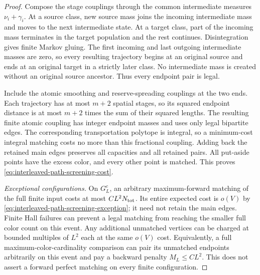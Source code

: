 \documentclass[11pt,reqno]{amsart}
\theoremstyle{definition}
\theoremstyle{remark}
\numberwithin{equation}{section}
\begin{document}
\begin{proof}
Compose the stage couplings through the common intermediate measures
$\nu_i+\gamma_i$. At a source class, new source mass joins the incoming
intermediate mass and moves to the next intermediate state. At a target
class, part of the incoming mass terminates in the target population
and the rest continues. Disintegration gives finite Markov gluing.
The first incoming and last outgoing intermediate masses are zero, so
every resulting trajectory begins at an original source and ends at an
original target in a strictly later class. No intermediate mass is
created without an original source ancestor. Thus every endpoint pair
is legal.

Include the atomic smoothing and reserve-spreading couplings at the
two ends. Each trajectory has at most $m+2$ spatial stages, so its
squared endpoint distance is at most $m+2$ times the sum of their squared
lengths. The resulting finite atomic coupling has integer endpoint
masses and uses only legal bipartite edges. The corresponding
transportation polytope is integral, so a minimum-cost integral
matching costs no more than this fractional coupling. Adding back the
retained main edges preserves all capacities and all retained pairs.
All put-aside points have the excess color, and every other point is
matched. This proves \eqref{eq:interleaved-path-screening-cost}.

\emph{Exceptional configurations.}
On $G_L^c$, an arbitrary maximum-forward matching of the full finite
input costs at most $CL^2N_{\rm tot}$. Its entire expected cost is
$o(V)$ by \eqref{eq:interleaved-path-screening-exception}; it need not
retain the main edges. Finite Hall failures can prevent a legal matching
from reaching the smaller full color count on this event. Any additional
unmatched vertices can be charged at bounded multiples of $L^2$ each
at the same $o(V)$ cost. Equivalently, a full maximum-color-cardinality
comparison can pair its unmatched endpoints arbitrarily on this event
and pay a backward penalty $M_L\le CL^2$. This does not assert a
forward perfect matching on every finite configuration.
\end{proof}
\end{document}
